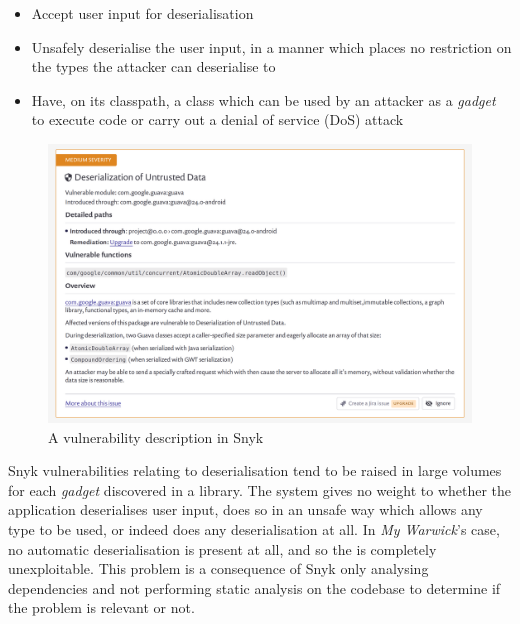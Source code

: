 \documentclass[a4paper,openany,12pt]{book}
\begin{document}
\begin{itemize}
    \item Accept user input for deserialisation
    \item Unsafely deserialise the user input, in a manner which places no restriction on the types the attacker can
          deserialise to
    \item Have, on its classpath, a class which can be used by an attacker as a \emph{gadget} to execute code or carry
          out a denial of service (DoS) attack
\end{itemize}

\begin{figure}
    \begin{MyMdframed}
        \vspace{0.5em}


        \caption{\label{figure:snyk}A vulnerability description in Snyk}
        \vspace{0.5em}
        \captionsetup{style=default}

        \centering \includegraphics[width=0.9\linewidth]{snyk.png}
    \end{MyMdframed}
\end{figure}

Snyk vulnerabilities relating to deserialisation tend to be raised in large volumes for each \emph{gadget} discovered in
a library.
The system gives no weight to whether the application deserialises user input, does so in an unsafe way which allows any
type to be used, or indeed does any deserialisation at all.
In \emph{My Warwick}'s case, no automatic deserialisation is present at all, and so the is completely unexploitable.
This problem is a consequence of Snyk only analysing dependencies and not performing static analysis on the codebase to
determine if the problem is relevant or not.
\end{document}
